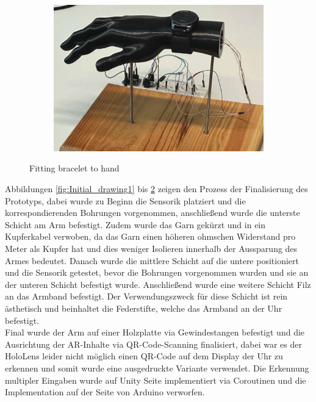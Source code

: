 \documentclass[11pt, a4paper]{article}
\begin{document}
\begin{figure}[h]
\begin{subfigure}[c]{0.3\textwidth}
		\includegraphics[scale=.62]{assets/final_prototyp.jpg}
		\label{fig:Initial_drawing6}
	\end{subfigure}
	\caption{Fitting bracelet to hand}
\end{figure}

\newpage


Abbildungen \ref{fig:Initial_drawing1} bis \ref{fig:Initial_drawing6} zeigen den Prozess der Finalisierung des Prototyps, dabei wurde zu Beginn die Sensorik platziert und die korrespondierenden Bohrungen vorgenommen, anschließend wurde die unterste Schicht am Arm befestigt.
Zudem wurde das Garn gekürzt und in ein Kupferkabel verwoben, da das Garn einen höheren ohmschen Widerstand pro Meter als Kupfer hat und dies weniger Isolieren innerhalb der Aussparung des Armes bedeutet.
Danach wurde die mittlere Schicht auf die untere positioniert und die Sensorik getestet, bevor die Bohrungen vorgenommen wurden und sie an der unteren Schicht befestigt wurde. Anschließend wurde eine weitere Schicht Filz an das Armband befestigt. 
Der Verwendungszweck für diese Schicht ist rein ästhetisch und beinhaltet die Federstifte, welche das Armband an der Uhr befestigt.\\
Final wurde der Arm auf einer Holzplatte via Gewindestangen befestigt und die Ausrichtung der AR-Inhalte via QR-Code-Scanning finalisiert, dabei war es der HoloLens leider nicht möglich einen QR-Code auf dem Display der Uhr zu erkennen und somit wurde eine ausgedruckte Variante verwendet.
Die Erkennung multipler Eingaben wurde auf Unity Seite implementiert via Coroutinen und die Implementation auf der Seite von Arduino verworfen.\\
\end{document}
